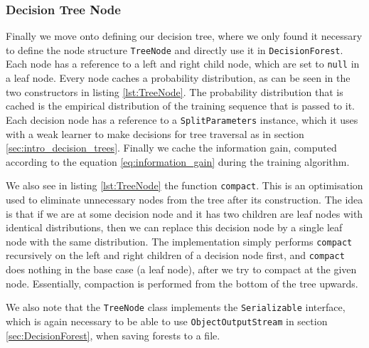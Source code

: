\documentclass[12pt,twoside,notitlepage]{report}
\begin{document}
            \subsubsection{Decision Tree Node}
                Finally we move onto defining our decision tree, where we only found it necessary to define the node 
                structure \texttt{TreeNode} and directly use it in \texttt{DecisionForest}. Each node has a reference 
                to a left and right child node, which are set to \texttt{null} in a leaf node. Every node caches a 
                probability distribution, as can be seen in the two constructors in listing \ref{lst:TreeNode}. The 
                probability distribution that is cached is the empirical distribution of the training sequence that is 
                passed to it. Each decision node has a reference to a \texttt{SplitParameters} instance, which it 
                uses with a weak learner to make decisions for tree traversal as in section 
                \ref{sec:intro_decision_trees}. Finally we cache the information gain, computed according to the 
                equation \ref{eq:information_gain} during the training algorithm.

                We also see in listing \ref{lst:TreeNode} the function \texttt{compact}. This is an optimisation 
                used to eliminate unnecessary nodes from the tree after its construction. The idea is that if we are at 
                some decision node and it has two children are leaf nodes with identical distributions, then we 
                can replace this decision node by a single leaf node with the same distribution. The implementation 
                simply performs \texttt{compact} recursively on the left and right children of a decision node first, 
                and \texttt{compact} does nothing in the base case (a leaf node), after we try to compact at the 
                given node. Essentially, compaction is performed from the bottom of the tree upwards.

                We also note that the \texttt{TreeNode} class implements the \texttt{Serializable} interface, 
                which is again necessary to be able to use \texttt{ObjectOutputStream} in section 
                \ref{sec:DecisionForest}, when saving forests to a file.
\end{document}
